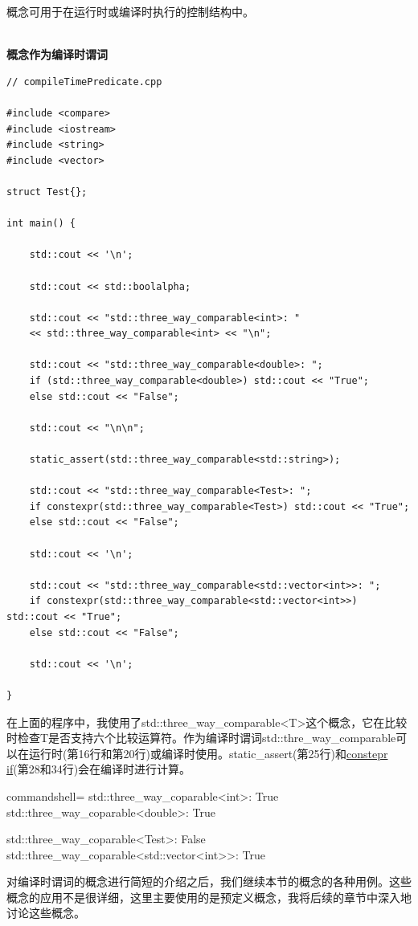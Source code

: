 概念可用于在运行时或编译时执行的控制结构中。

\hspace*{\fill} \\ %
\noindent
\textbf{概念作为编译时谓词}
\begin{lstlisting}[style=styleCXX]
// compileTimePredicate.cpp

#include <compare>
#include <iostream>
#include <string>
#include <vector>

struct Test{};

int main() {

	std::cout << '\n';
	
	std::cout << std::boolalpha;
	
	std::cout << "std::three_way_comparable<int>: "
	<< std::three_way_comparable<int> << "\n";
	
	std::cout << "std::three_way_comparable<double>: ";
	if (std::three_way_comparable<double>) std::cout << "True";
	else std::cout << "False";
	
	std::cout << "\n\n";
	
	static_assert(std::three_way_comparable<std::string>);
	
	std::cout << "std::three_way_comparable<Test>: ";
	if constexpr(std::three_way_comparable<Test>) std::cout << "True";
	else std::cout << "False";
	
	std::cout << '\n';
	
	std::cout << "std::three_way_comparable<std::vector<int>>: ";
	if constexpr(std::three_way_comparable<std::vector<int>>) std::cout << "True";
	else std::cout << "False";
	
	std::cout << '\n';

}
\end{lstlisting}

在上面的程序中，我使用了std::three\_way\_comparable<T>这个概念，它在比较时检查T是否支持六个比较运算符。作为编译时谓词std::thre\_way\_comparable可以在运行时(第16行和第20行)或编译时使用。static\_assert(第25行)和\href{https://en.cppreference.com/w/cpp/language/if}{constepr if}(第28和34行)会在编译时进行计算。

\begin{tcblisting}{commandshell={}}
std::three_way_coparable<int>: True
std::three_way_coparable<double>: True

std::three_way_coparable<Test>: False
std::three_way_coparable<std::vector<int>>: True
\end{tcblisting}

对编译时谓词的概念进行简短的介绍之后，我们继续本节的概念的各种用例。这些概念的应用不是很详细，这里主要使用的是预定义概念，我将后续的章节中深入地讨论这些概念。

